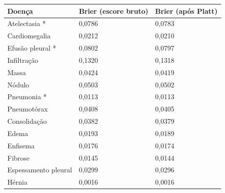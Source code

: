 \begin{tabular}{lll}
\toprule
Doença & Brier (escore bruto) & Brier (após Platt) \\
\midrule
Atelectasia * & 0,0786 & 0,0783 \\
Cardiomegalia & 0,0212 & 0,0210 \\
Efusão pleural * & 0,0802 & 0,0797 \\
Infiltração & 0,1320 & 0,1318 \\
Massa & 0,0424 & 0,0419 \\
Nódulo & 0,0503 & 0,0502 \\
Pneumonia * & 0,0113 & 0,0113 \\
Pneumotórax & 0,0408 & 0,0405 \\
Consolidação & 0,0382 & 0,0379 \\
Edema & 0,0193 & 0,0189 \\
Enfisema & 0,0176 & 0,0174 \\
Fibrose & 0,0145 & 0,0144 \\
Espessamento pleural & 0,0299 & 0,0296 \\
Hérnia & 0,0016 & 0,0016 \\
\bottomrule
\end{tabular}
